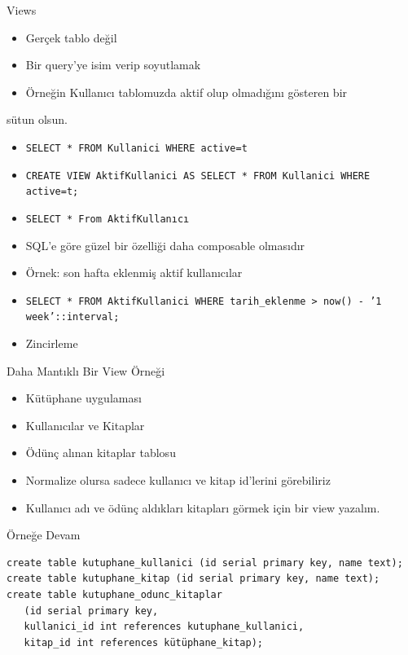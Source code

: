 \documentclass[presentation]{beamer}
\begin{document}
\begin{frame}[fragile,label=sec-29]{Views}
 \begin{itemize}
\item Gerçek tablo değil
\item Bir query'ye isim verip soyutlamak
\item Örneğin Kullanıcı tablomuzda aktif olup olmadığını gösteren bir
\end{itemize}
sütun olsun.
\begin{itemize}
\item \texttt{SELECT * FROM Kullanici WHERE active=t}
\item \texttt{CREATE VIEW AktifKullanici AS SELECT * FROM Kullanici WHERE active=t;}
\item \texttt{SELECT * From AktifKullanıcı}
\item SQL'e göre güzel bir özelliği daha composable olmasıdır
\item Örnek: son hafta eklenmiş aktif kullanıcılar
\item \texttt{SELECT * FROM AktifKullanici WHERE tarih\_eklenme > now() - '1 week'::interval;}
\item Zincirleme
\end{itemize}
\end{frame}

\begin{frame}[label=sec-30]{Daha Mantıklı Bir View Örneği}
\begin{itemize}
\item Kütüphane uygulaması
\item Kullanıcılar ve Kitaplar
\item Ödünç alınan kitaplar tablosu
\item Normalize olursa sadece kullanıcı ve kitap id'lerini görebiliriz
\item Kullanıcı adı ve ödünç aldıkları kitapları görmek için bir view yazalım.
\end{itemize}
\end{frame}

\begin{frame}[fragile,label=sec-31]{Örneğe Devam}
 \begin{verbatim}
create table kutuphane_kullanici (id serial primary key, name text);
create table kutuphane_kitap (id serial primary key, name text);
create table kutuphane_odunc_kitaplar
   (id serial primary key,
   kullanici_id int references kutuphane_kullanici,
   kitap_id int references kütüphane_kitap);
\end{verbatim}
\end{frame}
\end{document}
